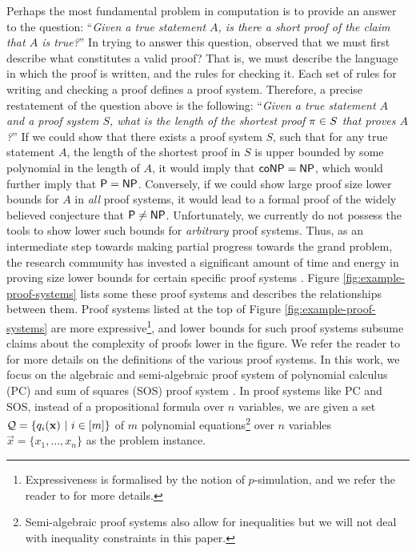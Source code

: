 \documentclass[11pt]{article}
\begin{document}
Perhaps the most fundamental problem in computation is to provide an answer to the question: ``\textit{Given a true statement $A$, is there a short proof of the claim that $A$ is true?}''
In trying to answer this question, \citet{cook1979relative} observed that we must first describe what constitutes a valid proof?
That is, we must describe the language in which the proof is written, and the rules for checking it.
Each set of rules for writing and checking a proof defines a proof system.
Therefore, a precise restatement of the question above is the following:  ``\textit{Given a true statement $A$ and a proof system $S$, what is the length of the shortest proof $\pi \in S$ that proves $A$?}''
If we could show that there exists a proof system $S$, such that for any true statement $A$, the length of the shortest proof in $S$ is upper bounded by some polynomial in the length of $A$, it would imply that $\mathsf{coNP} = \mathsf{NP}$, which would further imply that $\mathsf{P} = \mathsf{NP}$.
Conversely, if we could show large proof size lower bounds for $A$ in \emph{all} proof systems, it would lead to a formal proof of the widely believed conjecture that $\mathsf{P} \neq \mathsf{NP}$.
Unfortunately, we currently do not possess the tools to show lower such bounds for \emph{arbitrary} proof systems.
Thus, as an intermediate step towards making partial progress towards the grand problem, the research community has invested a significant amount of time and energy in proving size lower bounds for certain specific proof systems \citep{blake1937canonical,razborov1998lower, impagliazzo1999lower, alekhnovich2001lower, buss1999linear}.
 Figure \ref{fig:example-proof-systems} lists some these proof systems and describes the relationships between them.
Proof systems listed at the top of Figure \ref{fig:example-proof-systems} are more expressive\footnote{Expressiveness is formalised by the notion of $p$-simulation, and we refer the reader to \citep[Definition 1.6]{ProofComplexityLecNotes} for more details.}, and lower bounds for such proof systems subsume claims about the complexity of proofs lower in the figure.
We refer the reader to \citep{krajicek2019proof, ProofComplexityLecNotesPaul} for more details on the definitions of the various proof systems.
In this work, we focus on the algebraic and semi-algebraic proof system of polynomial calculus (PC) \citep{alekhnovich2004pseudorandom} and sum of squares (SOS) proof system \citep{parrilo2000structured, boazCourse}.
In proof systems like PC and SOS, instead of a propositional formula over $n$ variables, we are given a set $\mathcal{Q} =\{q_i(\mathbf{x}) \text{ } |\text{ } i \in [m] \}$ of $m$ polynomial equations\footnote{Semi-algebraic proof systems also allow for inequalities but we will not deal with inequality constraints in this paper.} over $n$ variables $\vec{x} = \{x_1, \dots, x_n\}$ as the problem instance.
\end{document}
